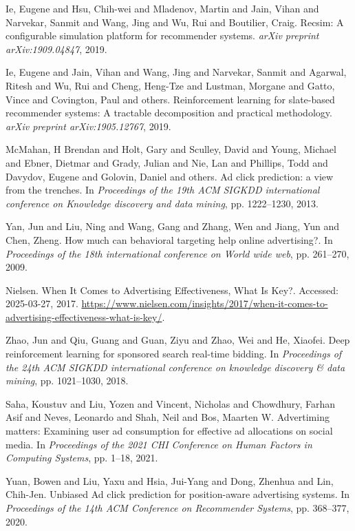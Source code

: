 \begin{thebibliography}{99}
 Ie, Eugene and Hsu, Chih-wei and Mladenov, Martin and Jain, Vihan and Narvekar, Sanmit and Wang, Jing and Wu, Rui and Boutilier, Craig. {R}ecsim: {A} configurable simulation platform for recommender systems. \textit{arXiv preprint arXiv:1909.04847}, 2019.

 Ie, Eugene and Jain, Vihan and Wang, Jing and Narvekar, Sanmit and Agarwal, Ritesh and Wu, Rui and Cheng, Heng-Tze and Lustman, Morgane and Gatto, Vince and Covington, Paul and others. {R}einforcement learning for slate-based recommender systems: {A} tractable decomposition and practical methodology. \textit{arXiv preprint arXiv:1905.12767}, 2019.

 McMahan, H Brendan and Holt, Gary and Sculley, David and Young, Michael and Ebner, Dietmar and Grady, Julian and Nie, Lan and Phillips, Todd and Davydov, Eugene and Golovin, Daniel and others. {A}d click prediction: a view from the trenches. In \textit{Proceedings of the 19th ACM SIGKDD international conference on Knowledge discovery and data mining}, pp. 1222--1230, 2013.

 Yan, Jun and Liu, Ning and Wang, Gang and Zhang, Wen and Jiang, Yun and Chen, Zheng. {H}ow much can behavioral targeting help online advertising?. In \textit{Proceedings of the 18th international conference on World wide web}, pp. 261--270, 2009.

 Nielsen. {W}hen {I}t {C}omes to {A}dvertising {E}ffectiveness, {W}hat {I}s {K}ey?. Accessed: 2025-03-27, 2017. \url{https://www.nielsen.com/insights/2017/when-it-comes-to-advertising-effectiveness-what-is-key/}.

 Zhao, Jun and Qiu, Guang and Guan, Ziyu and Zhao, Wei and He, Xiaofei. {D}eep reinforcement learning for sponsored search real-time bidding. In \textit{Proceedings of the 24th ACM SIGKDD international conference on knowledge discovery \& data mining}, pp. 1021--1030, 2018.

 Saha, Koustuv and Liu, Yozen and Vincent, Nicholas and Chowdhury, Farhan Asif and Neves, Leonardo and Shah, Neil and Bos, Maarten W. {A}dvertiming matters: {E}xamining user ad consumption for effective ad allocations on social media. In \textit{Proceedings of the 2021 CHI Conference on Human Factors in Computing Systems}, pp. 1--18, 2021.

 Yuan, Bowen and Liu, Yaxu and Hsia, Jui-Yang and Dong, Zhenhua and Lin, Chih-Jen. {U}nbiased {A}d click prediction for position-aware advertising systems. In \textit{Proceedings of the 14th ACM Conference on Recommender Systems}, pp. 368--377, 2020.


\end{thebibliography}
